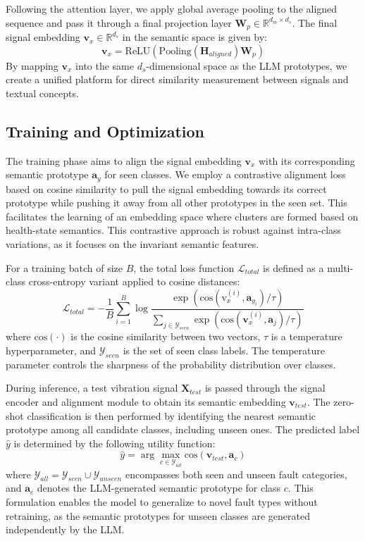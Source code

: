 Following the attention layer, we apply global average pooling to the aligned sequence and pass it through a final projection layer $\mathbf{W}_p \in \mathbb{R}^{d_m \times d_s}$. The final signal embedding $\mathbf{v}_x \in \mathbb{R}^{d_s}$ in the semantic space is given by:
\begin{equation}
\mathbf{v}_x = \text{ReLU}(\text{Pooling}(\mathbf{H}_{aligned}) \mathbf{W}_p)
\end{equation}
By mapping $\mathbf{v}_x$ into the same $d_s$-dimensional space as the LLM prototypes, we create a unified platform for direct similarity measurement between signals and textual concepts.

\subsection{Training and Optimization}
The training phase aims to align the signal embedding $\mathbf{v}_x$ with its corresponding semantic prototype $\mathbf{a}_{y}$ for seen classes. We employ a contrastive alignment loss \cite{chen2020simple} based on cosine similarity to pull the signal embedding towards its correct prototype while pushing it away from all other prototypes in the seen set. This facilitates the learning of an embedding space where clusters are formed based on health-state semantics. This contrastive approach is robust against intra-class variations, as it focuses on the invariant semantic features.

For a training batch of size $B$, the total loss function $\mathcal{L}_{total}$ is defined as a multi-class cross-entropy variant applied to cosine distances:
\begin{equation}
\mathcal{L}_{total} = -\frac{1}{B} \sum_{i=1}^{B} \log \frac{\exp(\text{cos}(\text{v}_x^{(i)}, \mathbf{a}_{y_i}) / \tau)}{\sum_{j \in \mathcal{Y}_{seen}} \exp(\text{cos}(\mathbf{v}_x^{(i)}, \mathbf{a}_j) / \tau)}
\end{equation}
where $\text{cos}(\cdot)$ is the cosine similarity between two vectors, $\tau$ is a temperature hyperparameter, and $\mathcal{Y}_{seen}$ is the set of seen class labels. The temperature parameter controls the sharpness of the probability distribution over classes.

During inference, a test vibration signal $\mathbf{X}_{test}$ is passed through the signal encoder and alignment module to obtain its semantic embedding $\mathbf{v}_{test}$. The zero-shot classification is then performed by identifying the nearest semantic prototype among all candidate classes, including unseen ones. The predicted label $\hat{y}$ is determined by the following utility function:
\begin{equation}
\hat{y} = \arg\max_{c \in \mathcal{Y}_{all}} \text{cos}(\mathbf{v}_{test}, \mathbf{a}_c)
\end{equation}
where $\mathcal{Y}_{all} = \mathcal{Y}_{seen} \cup \mathcal{Y}_{unseen}$ encompasses both seen and unseen fault categories, and $\mathbf{a}_c$ denotes the LLM-generated semantic prototype for class $c$. This formulation enables the model to generalize to novel fault types without retraining, as the semantic prototypes for unseen classes are generated independently by the LLM.

